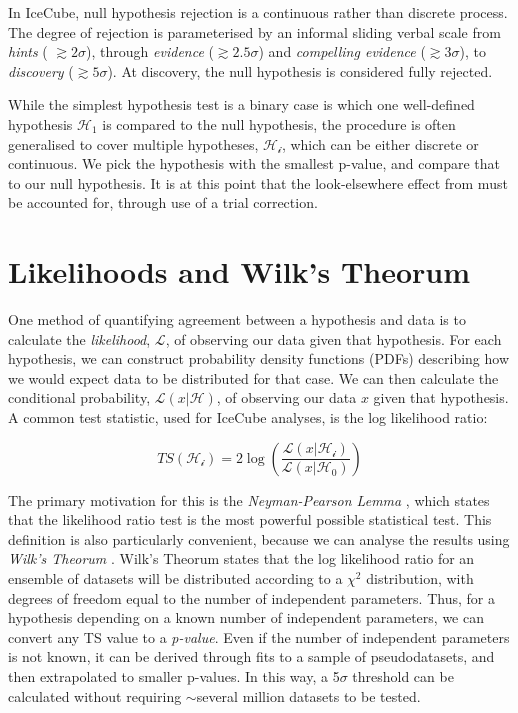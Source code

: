 In IceCube, null hypothesis rejection is a continuous rather than discrete process. The degree of rejection is parameterised by an informal sliding verbal scale from \emph{hints} ( $\gtrsim 2 \sigma$), through \emph{evidence} ($\gtrsim2.5 \sigma$) and \emph{compelling evidence} ($\gtrsim3 \sigma$), to \emph{discovery} ($\gtrsim5 \sigma$). At discovery, the null hypothesis is considered fully rejected.

While the simplest hypothesis test is a binary case is which one well-defined hypothesis $\mathcal{H_{1}}$ is compared to the null hypothesis, the procedure is often generalised to cover multiple hypotheses, $\mathcal{H_{i}}$, which can be either discrete or continuous. We pick the hypothesis with the smallest p-value, and compare that to our null hypothesis. It is at this point that the look-elsewhere effect from must be accounted for, through use of a trial correction. 

\section{Likelihoods and Wilk's Theorum}

One method of quantifying agreement between a hypothesis and data is to calculate the \emph{likelihood}, $\mathcal{L}$, of observing our data given that hypothesis. For each hypothesis, we can construct probability density functions (PDFs) describing how we would expect data to be distributed for that case. We can then calculate the conditional probability, $\mathcal{L}(x | \mathcal{H})$, of observing our data $x$ given that hypothesis. A common test statistic, used for IceCube analyses, is the log likelihood ratio:

\begin{equation}
TS (\mathcal{H_{i}}) = 2 \log \left( \frac{\mathcal{L}(x | \mathcal{H_{i}})}{\mathcal{L}(x | \mathcal{H_{0}})} \right)
\end{equation}

The primary motivation for this is the \emph{Neyman-Pearson Lemma} , which states that the likelihood ratio test is the most powerful possible statistical test. This definition is also particularly convenient, because we can analyse the results using \emph{Wilk's Theorum} . Wilk's Theorum states that the log likelihood ratio for an ensemble of datasets will be distributed according to a $\chi^{2}$ distribution, with degrees of freedom equal to the number of independent parameters. Thus, for a hypothesis depending on a known number of independent parameters, we can convert any TS value to a \emph{p-value}. Even if the number of independent parameters is not known, it can be derived through fits to a sample of pseudodatasets, and then extrapolated to smaller p-values. In this way, a 5$\sigma$ threshold can be calculated without requiring $\sim$several million datasets to be tested.

